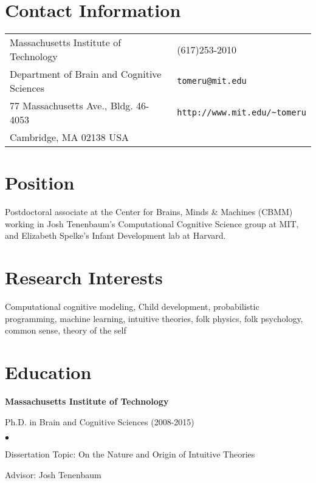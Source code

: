 \documentclass[margin,line,pifont,palatino,courier]{res}
\newenvironment{list1}{
  \begin{list}{\ding{113}}{%
      \setlength{\itemsep}{0in}
      \setlength{\parsep}{0in} \setlength{\parskip}{0in}
      \setlength{\topsep}{0in} \setlength{\partopsep}{0in}
      \setlength{\leftmargin}{0.17in}}}{\end{list}}
\newenvironment{list2}{
  \begin{list}{$\bullet$}{%
      \setlength{\itemsep}{0in}
      \setlength{\parsep}{0in} \setlength{\parskip}{0in}
      \setlength{\topsep}{0in} \setlength{\partopsep}{0in}
      \setlength{\leftmargin}{0.2in}}}{\end{list}}
\begin{document}

\begin{resume}

\section{\sc Contact Information}

\vspace{.05in}
\begin{tabular}{@{}p{2.75in}p{2in}}
Massachusetts Institute of Technology & (617)253-2010 \\
Department of Brain and Cognitive Sciences                        & \verb+tomeru@mit.edu+\\
77 Massachusetts Ave., Bldg. 46-4053            & \verb+http://www.mit.edu/~tomeru+\\
Cambridge, MA 02138 USA               & \\
\end{tabular}

\section{\sc Position}
Postdoctoral associate at the Center for Brains, Minds \& Machines (CBMM) working in Josh Tenenbaum's Computational Cognitive Science group at MIT, and Elizabeth Spelke's Infant Development lab at Harvard. 

\section{\sc Research Interests}
Computational cognitive modeling, Child development, probabilistic programming, machine learning, intuitive theories, folk physics, folk psychology, common sense, theory of the self

\section{\sc Education}

{\bf Massachusetts Institute of Technology}\\
\vspace*{-.1in}
\begin{list1}
\item[] Ph.D. in Brain and Cognitive Sciences (2008-2015)

\begin{list2}
\vspace*{.05in}
\item Dissertation Topic:  On the Nature and Origin of Intuitive Theories
\item Advisor: Josh Tenenbaum
\end{list2}
\end{list1}


\end{resume}
\end{document}
